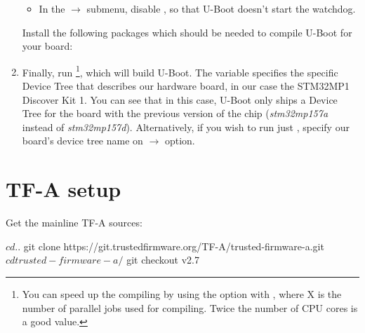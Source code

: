 \begin{enumerate}
\begin{itemize}
  \item In the  $\rightarrow$  submenu, disable , so that U-Boot doesn't start the
    watchdog.
  \end{itemize}

Install the following packages which should be needed to compile U-Boot for
your board:


\item Finally, run \footnote{You can speed up the
    compiling by using the  option with , where X
    is the number of parallel jobs used for compiling. Twice the
    number of CPU cores is a good value.}, which will build
  U-Boot. The  variable specifies the specific
  Device Tree that describes our hardware board, in our case the
  STM32MP1 Discover Kit 1. You can see that in this case, U-Boot
  only ships a Device Tree for the board with the previous version
  of the chip ({\em stm32mp157a} instead of {\em stm32mp157d}).
  Alternatively, if you wish to run just ,
  specify our board's device tree name on
   $\rightarrow$ 
  option.
\end{enumerate}

\section{TF-A setup}

Get the mainline TF-A sources:

\begin{bashinput}
$ cd ..
$ git clone https://git.trustedfirmware.org/TF-A/trusted-firmware-a.git
$ cd trusted-firmware-a/
$ git checkout v2.7
\end{bashinput}

